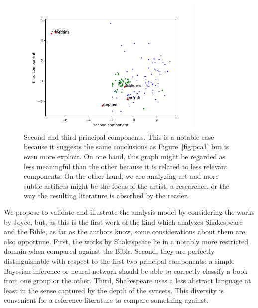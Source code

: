 \documentclass[12pt,fleqn]{article}
\begin{document}
\begin{figure}[!htbp] %
\vspace{-2pt}
\begin{center}
\includegraphics[height=6.7cm,width=9cm]{figs/pca3}%
\caption{Second and third principal components.
    This is a notable case because it suggests the
    same conclusions as Figure~\ref{fig:pca1} but is even more explicit.
    On one hand, this graph might be regarded as less meaningful than the other because it is related to less relevant components.
    On the other hand, we are analyzing art and more subtle artifices might be the focus of the artist,
    a researcher, or the way the resulting literature is absorbed by the reader.}
\label{fig:pca3}%
\end{center}
\end{figure}

We propose to validate and illustrate the analysis model by considering the
works by Joyce, but, as this is the first work of the kind which analyzes
Shakespeare and the Bible, as far as the authors know,
some considerations about them are also opportune.
First, the works by Shakespeare lie in a notably more restricted domain
when compared against the Bible.
Second, they are perfectly distinguishable with respect to the first two
principal components: a simple Bayesian inference or neural network
should be able to correctly classify a book from one group or the other.
Third, Shakespeare uses a less abstract language at least in the sense captured
by the depth of the synsets.
This diversity is convenient for a reference literature to compare something against.
\end{document}
